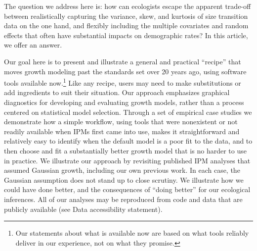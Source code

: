 \documentclass[12pt]{article}
\begin{document}
The question we address here is: how can ecologists escape the apparent trade-off between realistically capturing the variance, skew, and kurtosis of size transition data on the one hand, and flexibly including the multiple covariates and random effects that often have substantial impacts on demographic rates?   
In this article, we offer an answer. 

Our goal here is to present and illustrate a general and practical ``recipe'' that moves growth modeling past the standards set over 20 years ago, using software tools available now.\footnote{Our statements about what is available now are based on what tools reliably deliver in our experience, not on what they promise.} 
Like any recipe, users may need to make substitutions or add ingredients to suit their situation. 
Our approach emphasizes graphical diagnostics for developing and evaluating growth models, rather than a process centered on statistical model selection. 
Through a set of empirical case studies we demonstrate how a simple workflow, using tools that were nonexistent or not readily available when IPMs first came into use, makes it straightforward and relatively easy to identify when the default model is a poor fit to the data, and to then choose and fit a substantially better growth model that is no harder to use in practice. 
We illustrate our approach by revisiting published IPM analyses that assumed Gaussian growth, including our own previous work.
In each case, the Gaussian assumption does not stand up to close scrutiny. 
We illustrate how we could have done better, and the consequences of ``doing better'' for our ecological inferences. 
All of our analyses may be reproduced from code and data that are publicly available (see Data accessibility statement). 
\end{document}
